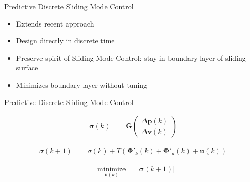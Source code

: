 \documentclass[12pt,svgnames,table,draft=false]{beamer}
\newcommand{\mbf}[1]{\mathbf{#1}}
\providecommand{\mbf}[1]{\mathbf{#1}}
\newcommand{\idxSample}{{\ensuremath{k}}}
\begin{document}
\usebackgroundtemplate{
}

\begin{frame}{Predictive Discrete Sliding Mode Control}
\centering
\begin{tcolorbox}[colback=blue!5!white,colframe=blue!75!black,title=PDSMC]
\begin{itemize}
\item Extends recent approach \cite{houda2013new}
\item Design directly in discrete time
\item Preserve spirit of Sliding Mode Control: stay in boundary layer of sliding surface
\item Minimizes boundary layer without tuning
\end{itemize}
\end{tcolorbox}
\end{frame}

\begin{frame}{Predictive Discrete Sliding Mode Control}
\centering
\begin{tcolorbox}[colback=blue!5!white,colframe=blue!75!black,title=What it looks like, width=.8\paperwidth]

\begin{align}
\mbf{\sigma}(\idxSample) &= \mbf{G}
\begin{pmatrix}
\Delta \mbf{p}(\idxSample)\\
\Delta \mbf{v}(\idxSample)
\end{pmatrix} \nonumber
\end{align}

\begin{align}
{{\sigma}}(\idxSample+1)
&=
{{\sigma}}(\idxSample)
+
T(
\mbf{\Phi}'_k(\idxSample) + \mbf{\Phi}'_u(\idxSample) + \mbf{u}(\idxSample))
\nonumber
\end{align}

\begin{align}
& \underset{\mbf{u}(\idxSample)}{\text{minimize}}
& & |\mbf{\sigma}(\idxSample+1)| \nonumber 
\end{align}

\end{tcolorbox}

\end{frame}
\end{document}
